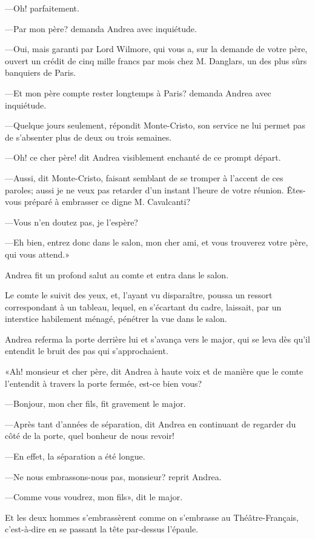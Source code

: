 —Oh! parfaitement. 

—Par mon père? demanda Andrea avec inquiétude. 

—Oui, mais garanti par Lord Wilmore, qui vous a, sur la demande de votre père, ouvert un crédit de cinq mille francs par mois chez M. Danglars, un des plus sûrs banquiers de Paris. 

—Et mon père compte rester longtemps à Paris? demanda Andrea avec inquiétude. 

—Quelque jours seulement, répondit Monte-Cristo, son service ne lui permet pas de s'absenter plus de deux ou trois semaines. 

—Oh! ce cher père! dit Andrea visiblement enchanté de ce prompt départ. 

—Aussi, dit Monte-Cristo, faisant semblant de se tromper à l'accent de ces paroles; aussi je ne veux pas retarder d'un instant l'heure de votre réunion. Êtes-vous préparé à embrasser ce digne M. Cavalcanti? 

—Vous n'en doutez pas, je l'espère? 

—Eh bien, entrez donc dans le salon, mon cher ami, et vous trouverez votre père, qui vous attend.» 

Andrea fit un profond salut au comte et entra dans le salon. 

Le comte le suivit des yeux, et, l'ayant vu disparaître, poussa un ressort correspondant à un tableau, lequel, en s'écartant du cadre, laissait, par un interstice habilement ménagé, pénétrer la vue dans le salon. 

Andrea referma la porte derrière lui et s'avança vers le major, qui se leva dès qu'il entendit le bruit des pas qui s'approchaient. 

«Ah! monsieur et cher père, dit Andrea à haute voix et de manière que le comte l'entendit à travers la porte fermée, est-ce bien vous? 

—Bonjour, mon cher fils, fit gravement le major. 

—Après tant d'années de séparation, dit Andrea en continuant de regarder du côté de la porte, quel bonheur de nous revoir! 

—En effet, la séparation a été longue. 

—Ne nous embrassons-nous pas, monsieur? reprit Andrea. 

—Comme vous voudrez, mon fils», dit le major. 

Et les deux hommes s'embrassèrent comme on s'embrasse au Théâtre-Français, c'est-à-dire en se passant la tête par-dessus l'épaule.  

